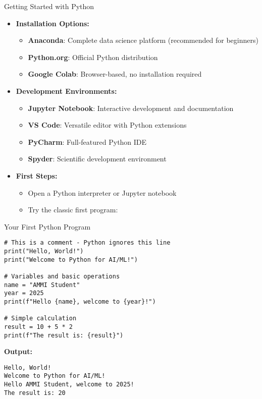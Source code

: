 \begin{frame}{Getting Started with Python}
    \begin{itemize}
        \item \textbf{Installation Options:}
        \begin{itemize}
            \item \textbf{Anaconda}: Complete data science platform (recommended for beginners)
            \item \textbf{Python.org}: Official Python distribution
            \item \textbf{Google Colab}: Browser-based, no installation required
        \end{itemize}
        
        \item \textbf{Development Environments:}
        \begin{itemize}
            \item \textbf{Jupyter Notebook}: Interactive development and documentation
            \item \textbf{VS Code}: Versatile editor with Python extensions
            \item \textbf{PyCharm}: Full-featured Python IDE
            \item \textbf{Spyder}: Scientific development environment
        \end{itemize}
        
        \item \textbf{First Steps:}
        \begin{itemize}
            \item Open a Python interpreter or Jupyter notebook
            \item Try the classic first program: 
        \end{itemize}
    \end{itemize}
\end{frame}

\begin{frame}[fragile]{Your First Python Program}
    \begin{codeblock}
        \begin{lstlisting}
# This is a comment - Python ignores this line
print("Hello, World!")
print("Welcome to Python for AI/ML!")

# Variables and basic operations
name = "AMMI Student"
year = 2025
print(f"Hello {name}, welcome to {year}!")

# Simple calculation
result = 10 + 5 * 2
print(f"The result is: {result}")
        \end{lstlisting}
    \end{codeblock}
    
    \textbf{Output:}
    \begin{block}{}
        \footnotesize
        \texttt{Hello, World!} \\
        \texttt{Welcome to Python for AI/ML!} \\
        \texttt{Hello AMMI Student, welcome to 2025!} \\
        \texttt{The result is: 20}
    \end{block}
\end{frame}

